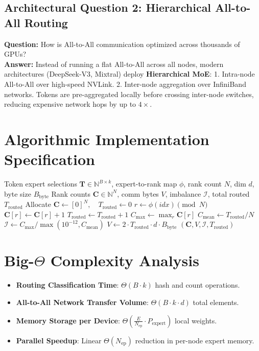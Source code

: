 \documentclass[11pt,a4paper]{article}
\theoremstyle{definition}
\begin{document}
\subsection{Architectural Question 2: Hierarchical All-to-All Routing}
\textbf{Question:} How is All-to-All communication optimized across thousands of GPUs?\\
\textbf{Answer:} Instead of running a flat All-to-All across all nodes, modern architectures (DeepSeek-V3, Mixtral) deploy \textbf{Hierarchical MoE}:
1. Intra-node All-to-All over high-speed NVLink.
2. Inter-node aggregation over InfiniBand networks.
Tokens are pre-aggregated locally before crossing inter-node switches, reducing expensive network hops by up to $4\times$.

\section{Algorithmic Implementation Specification}

\begin{algorithm}[H]
\caption{Expert Parallelism All-to-All Dispatch Accounting}
\begin{algorithmic}[1]
\Require Token expert selections $\mathbf{T} \in \mathbb{N}^{B \times k}$, expert-to-rank map $\phi$, rank count $N$, dim $d$, byte size $B_{\text{byte}}$
\Ensure Rank counts $\mathbf{C} \in \mathbb{N}^N$, comm bytes $V$, imbalance $\mathcal{I}$, total routed $T_{\text{routed}}$
\State Allocate $\mathbf{C} \gets [0]^N, \quad T_{\text{routed}} \gets 0$
        \State $r \gets \phi(idx) \pmod N$
        \State $\mathbf{C}[r] \gets \mathbf{C}[r] + 1$
        \State $T_{\text{routed}} \gets T_{\text{routed}} + 1$
    \EndFor
\EndFor
\State $C_{\max} \gets \max_r \mathbf{C}[r]$
\State $C_{\text{mean}} \gets T_{\text{routed}} / N$
\State $\mathcal{I} \gets C_{\max} / \max(10^{-12}, C_{\text{mean}})$
\State $V \gets 2 \cdot T_{\text{routed}} \cdot d \cdot B_{\text{byte}}$ 
\State \Return $(\mathbf{C}, V, \mathcal{I}, T_{\text{routed}})$
\end{algorithmic}
\end{algorithm}

\section{Big-$\Theta$ Complexity Analysis}

\begin{itemize}
    \item \textbf{Routing Classification Time}: $\Theta(B \cdot k)$ hash and count operations.
    \item \textbf{All-to-All Network Transfer Volume}: $\Theta(B \cdot k \cdot d)$ total elements.
    \item \textbf{Memory Storage per Device}: $\Theta\left(\frac{E}{N_{\text{ep}}} \cdot P_{\text{expert}}\right)$ local weights.
    \item \textbf{Parallel Speedup}: Linear $\Theta(N_{\text{ep}})$ reduction in per-node expert memory.
\end{itemize}
\end{document}
